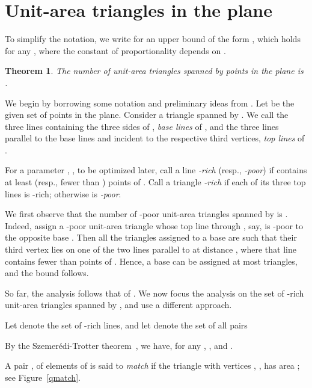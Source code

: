 \documentclass[12pt]{article}
\newtheorem{theorem}{Theorem}[section]
\begin{document}
\section{Unit-area triangles in the plane}
\label{sec:unit2}

To simplify the notation, we write  for an upper bound of
the form , which holds for any ,
where the constant of proportionality  depends on .

\begin{theorem}\label{thm:unit2}
The number of unit-area triangles spanned by  points in the plane
is .
\end{theorem}
We begin by borrowing some notation and preliminary ideas from
\cite{DST08}.
Let  be the given set of  points in the plane. Consider a triangle
 spanned by . We call the three lines containing the
three sides of , {\em base lines} of , and the
three lines parallel to the base lines and incident to the respective
third vertices, {\em top lines} of .

For a parameter , , to be optimized
later, call a line  {\em -rich} (resp., {\em -poor}) if
 contains at least  (resp., fewer than ) points of .
Call a triangle  {\em -rich} if each of its three top
lines is -rich; otherwise  is {\em -poor}. 

We first observe that the number of -poor unit-area triangles
spanned by  is . Indeed, assign a -poor unit-area
triangle  whose top line through , say, is -poor
to the opposite base . Then all the triangles assigned to a base
 are such that their third vertex lies on one of the two lines
parallel to  at distance , where that line contains
fewer than  points of . Hence, a base  can be assigned at
most  triangles, and the bound follows.

So far, the analysis follows that of \cite{DST08}.
We now focus the analysis on the set of -rich unit-area triangles
spanned by , and use a different approach.

Let  denote the set of -rich lines, and let  denote the set 
of all pairs

By the Szemer\'edi-Trotter theorem~\cite{ST83}, we have,
for any , , and
.

A pair ,  of elements of  is said
to {\em match} if the triangle with vertices , ,
 has area ; see Figure~\ref{qmatch}.
\end{document}
